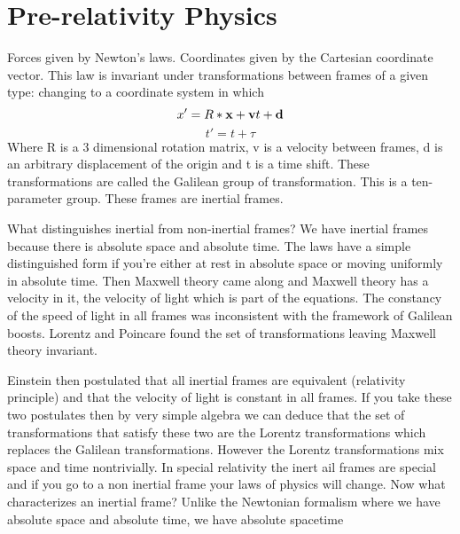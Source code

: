 \section{Pre-relativity Physics}

Forces given by Newton's laws. Coordinates given by the Cartesian
coordinate vector. This law is invariant under transformations between frames of a
  given type: changing to a coordinate system in which 
\begin{equation}
x' = R * \mathbf{x} + \mathbf{v} t + \mathbf{d}
\end{equation}
\begin{equation}
t' = t + \tau
\end{equation}
Where R is a 3 dimensional rotation matrix, v is a velocity between
frames, d is an arbitrary displacement of the origin and t is a time
shift.  These transformations are called the Galilean group of
transformation. This is a ten-parameter group. These frames are
inertial frames.

What distinguishes inertial from non-inertial frames? We have inertial
frames because there is absolute space and absolute time. The laws
have a simple distinguished form if you're either at rest in absolute
space or moving uniformly in absolute time. Then Maxwell theory came
along and Maxwell theory has a velocity in it, the velocity of light
which is part of the equations. The constancy of the speed of light in
all frames was inconsistent with the
framework of Galilean boosts. Lorentz and Poincare found the set of
transformations leaving Maxwell theory invariant.

Einstein then postulated that all inertial frames are equivalent
(relativity principle) and that the velocity of light is constant in
all frames. If you take these two postulates then by very simple
algebra we can deduce that the set of transformations that satisfy
these two are the Lorentz transformations which replaces the Galilean
transformations. However the Lorentz
transformations mix space and time nontrivially. In special relativity
the inert ail frames are special and if you go to a non inertial frame
your laws of physics will change. Now what characterizes an inertial
frame? Unlike the Newtonian formalism where we have absolute space and
absolute time, we have absolute spacetime





